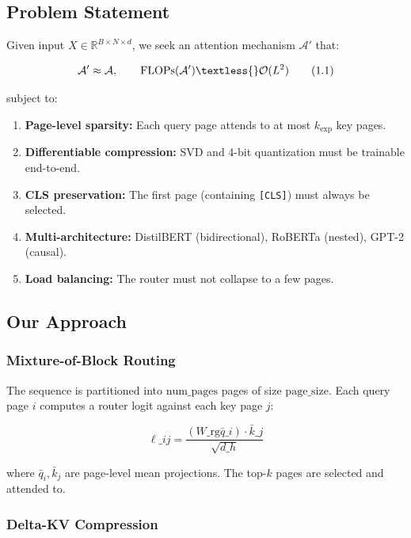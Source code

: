 \subsection{Problem Statement}

Given input $X \in \mathbb{R}^{B \times N \times d}$, we seek an attention 
mechanism $\mathcal{A}'$ that:

\[
\mathcal{A}' \approx \mathcal{A}, \qquad
\text{FLOPs}(\mathcal{A}') \textless{} \mathcal{O}(L^2)
\tag{1.1}
\]

subject to:

\begin{enumerate}
\item \textbf{Page-level sparsity:} Each query page attends to at most $k_\text{exp}$
  key pages.
\item \textbf{Differentiable compression:} SVD and 4-bit quantization must be
  trainable end-to-end.
\item \textbf{CLS preservation:} The first page (containing \texttt{[CLS]}) must always be
  selected.
\item \textbf{Multi-architecture:} DistilBERT (bidirectional), RoBERTa (nested),
  GPT-2 (causal).
\item \textbf{Load balancing:} The router must not collapse to a few pages.

\end{enumerate}
\subsection{Our Approach}

\subsubsection{Mixture-of-Block Routing}

The sequence is partitioned into $\text{num\_pages}$ pages of size 
$\text{page\_size}$. Each query page $i$ computes a router logit against 
each key page $j$:

\[
\ell\_{ij} = \frac{(W\_\text{rg} \bar{q}\_i) \cdot \bar{k}\_j}{\sqrt{d\_h}}
\tag{1.2}
\]

where $\bar{q}_i, \bar{k}_j$ are page-level mean projections. The top-$k$ 
pages are selected and attended to.

\subsubsection{Delta-KV Compression}

